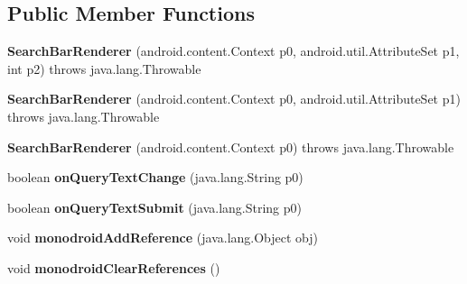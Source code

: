 \subsection*{Public Member Functions}
\begin{DoxyCompactItemize}
\item 
\mbox{\label{classmd5b60ffeb829f638581ab2bb9b1a7f4f3f_1_1SearchBarRenderer_a0c52f1938dc18326653f3a5413d92428}} 
{\bfseries Search\+Bar\+Renderer} (android.\+content.\+Context p0, android.\+util.\+Attribute\+Set p1, int p2)  throws java.\+lang.\+Throwable 	
\item 
\mbox{\label{classmd5b60ffeb829f638581ab2bb9b1a7f4f3f_1_1SearchBarRenderer_a878e0ca2cd8969a1c594bb1dae952c3a}} 
{\bfseries Search\+Bar\+Renderer} (android.\+content.\+Context p0, android.\+util.\+Attribute\+Set p1)  throws java.\+lang.\+Throwable 	
\item 
\mbox{\label{classmd5b60ffeb829f638581ab2bb9b1a7f4f3f_1_1SearchBarRenderer_a7c99ebcffaa2c273a4adbc8e4fc8281a}} 
{\bfseries Search\+Bar\+Renderer} (android.\+content.\+Context p0)  throws java.\+lang.\+Throwable 	
\item 
\mbox{\label{classmd5b60ffeb829f638581ab2bb9b1a7f4f3f_1_1SearchBarRenderer_a53f7d71599559efcc390efdec95a3527}} 
boolean {\bfseries on\+Query\+Text\+Change} (java.\+lang.\+String p0)
\item 
\mbox{\label{classmd5b60ffeb829f638581ab2bb9b1a7f4f3f_1_1SearchBarRenderer_a69d8a7b933f0c7ac02d7d945868f8037}} 
boolean {\bfseries on\+Query\+Text\+Submit} (java.\+lang.\+String p0)
\item 
\mbox{\label{classmd5b60ffeb829f638581ab2bb9b1a7f4f3f_1_1SearchBarRenderer_a9b7a0243add9b3f0e1e1e2e9883f69c6}} 
void {\bfseries monodroid\+Add\+Reference} (java.\+lang.\+Object obj)
\item 
\mbox{\label{classmd5b60ffeb829f638581ab2bb9b1a7f4f3f_1_1SearchBarRenderer_a3c10c17f8a9cdc8b84310d45c845399a}} 
void {\bfseries monodroid\+Clear\+References} ()
\end{DoxyCompactItemize}
